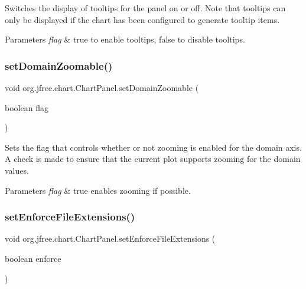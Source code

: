 Switches the display of tooltips for the panel on or off. Note that tooltips can only be displayed if the chart has been configured to generate tooltip items.


\begin{DoxyParams}{Parameters}
{\em flag} & {\ttfamily true} to enable tooltips, {\ttfamily false} to disable tooltips. \\
\hline
\end{DoxyParams}
\mbox{\label{classorg_1_1jfree_1_1chart_1_1_chart_panel_ae8ea6f7c3fa262fac32a8a584c9008f4}} 
\subsubsection{\texorpdfstring{set\+Domain\+Zoomable()}{setDomainZoomable()}}
{\footnotesize\ttfamily void org.\+jfree.\+chart.\+Chart\+Panel.\+set\+Domain\+Zoomable (\begin{DoxyParamCaption}\item[{boolean}]{flag }\end{DoxyParamCaption})}

Sets the flag that controls whether or not zooming is enabled for the domain axis. A check is made to ensure that the current plot supports zooming for the domain values.


\begin{DoxyParams}{Parameters}
{\em flag} & {\ttfamily true} enables zooming if possible. \\
\hline
\end{DoxyParams}
\mbox{\label{classorg_1_1jfree_1_1chart_1_1_chart_panel_abb236dd517452e470fafc8b91923fde2}} 
\subsubsection{\texorpdfstring{set\+Enforce\+File\+Extensions()}{setEnforceFileExtensions()}}
{\footnotesize\ttfamily void org.\+jfree.\+chart.\+Chart\+Panel.\+set\+Enforce\+File\+Extensions (\begin{DoxyParamCaption}\item[{boolean}]{enforce }\end{DoxyParamCaption})}

